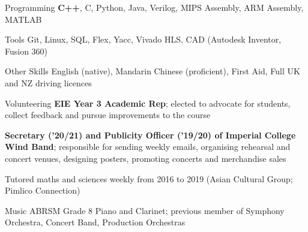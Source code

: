 

\begin{cvskills}


  \cvskill
    {Programming} %
    {\textbf{C++}, C, Python, Java, Verilog, MIPS Assembly, ARM Assembly, MATLAB} %

  \cvskill
    {Tools} %
    {Git, Linux, SQL, Flex, Yacc, Vivado HLS, CAD (Autodesk Inventor, Fusion 360)} %

  \cvskill
    {Other Skills}
    {English (native), Mandarin Chinese (proficient), First Aid, Full UK and NZ driving licences}

  \cvskill
    {Volunteering} %
    {\textbf{EIE Year 3 Academic Rep}; elected to advocate for students, collect feedback and pursue improvements to the course} %

  \cvskill
    {} %
    {\textbf{Secretary ('20/21) and Publicity Officer ('19/20) of Imperial College Wind Band}; responsible for sending weekly emails, organising rehearsal and concert venues, designing posters, promoting concerts and merchandise sales} %


  \cvskill
    {} %
    {Tutored maths and sciences weekly from 2016 to 2019 (Asian Cultural Group; Pimlico Connection)} %

  \cvskill
    {Music} %
    {ABRSM Grade 8 Piano and Clarinet; previous member of Symphony Orchestra, Concert Band, Production Orchestras} %


\end{cvskills}
